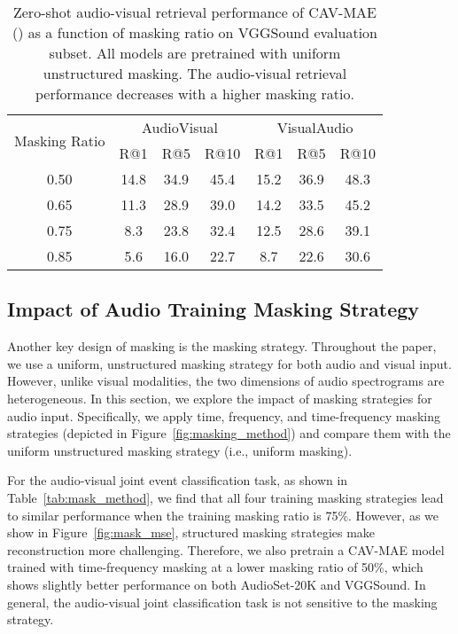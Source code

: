 \documentclass{article} \usepackage{iclr2023_conference,times}
\begin{document}
\begin{table}[h]
\centering
\caption{Zero-shot audio-visual retrieval performance of CAV-MAE () as a function of masking ratio on VGGSound evaluation subset. All models are pretrained with uniform unstructured masking. The audio-visual retrieval performance decreases with a higher masking ratio.}
\label{tab:mask_ratio_retrieval}
\begin{tabular}{@{}ccccccc@{}}
\toprule
\multirow{2}{*}{Masking Ratio} & \multicolumn{3}{c}{AudioVisual} & \multicolumn{3}{c}{VisualAudio} \\ \cmidrule(l){2-7} 
                               & R@1            & R@5           & R@10          & R@1            & R@5           & R@10          \\ \midrule
0.50                           & 14.8           & 34.9          & 45.4          & 15.2           & 36.9          & 48.3          \\
0.65                           & 11.3           & 28.9          & 39.0          & 14.2           & 33.5          & 45.2          \\
0.75                           & 8.3            & 23.8          & 32.4          & 12.5           & 28.6          & 39.1          \\
0.85                           & 5.6            & 16.0          & 22.7          & 8.7            & 22.6          & 30.6          \\ \bottomrule
\end{tabular}
\end{table}

\subsection{Impact of Audio Training Masking Strategy}

Another key design of masking is the masking strategy. Throughout the paper, we use a uniform, unstructured masking strategy for both audio and visual input. However, unlike visual modalities, the two dimensions of audio spectrograms are heterogeneous. In this section, we explore the impact of masking strategies for audio input. Specifically, we apply time, frequency, and time-frequency masking strategies (depicted in Figure~\ref{fig:masking_method}) and compare them with the uniform unstructured masking strategy (i.e., uniform masking). 

For the audio-visual joint event classification task, as shown in Table~\ref{tab:mask_method}, we find that all four training masking strategies lead to similar performance when the training masking ratio is 75\%. However, as we show in Figure~\ref{fig:mask_mse}, structured masking strategies make reconstruction more challenging. Therefore, we also pretrain a CAV-MAE model trained with time-frequency masking at a lower masking ratio of 50\%, which shows slightly better performance on both AudioSet-20K and VGGSound. In general, the audio-visual joint classification task is not sensitive to the masking strategy.
\end{document}
